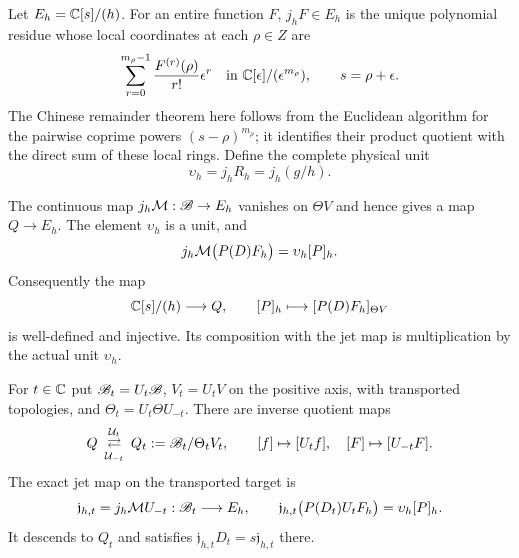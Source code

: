Let $E_h=\mathbb C[s]/(h)$. For an entire function $F$, $j_hF\in E_h$
is the unique polynomial residue whose local coordinates at each
$\rho\in Z$ are
\begin{equation}\label{hdt:eq:jets}
\sum_{r=0}^{m_\rho-1}\frac{F^{(r)}(\rho)}{r!}\epsilon^r
\quad\text{in }\mathbb C[\epsilon]/(\epsilon^{m_\rho}),\qquad s=\rho+\epsilon.
\end{equation}
The Chinese remainder theorem here follows from the Euclidean
algorithm for the pairwise coprime powers $(s-\rho)^{m_\rho}$;
it identifies their product quotient with the direct sum of these
local rings. Define the complete physical unit
\begin{equation}\label{hdt:eq:unit}
\upsilon_h=j_hR_h=j_h(g/h).
\end{equation}

\begin{hdttheorem}\label{hdt:thm:jets}
The continuous map $j_h\mathcal M:\mathscr B\to E_h$ vanishes on $\Theta V$
and hence gives a map $Q\to E_h$. The element $\upsilon_h$ is
a unit, and
\begin{equation}\label{hdt:eq:physical-jet}
j_h\mathcal M\bigl(P(D)F_h\bigr)=\upsilon_h[P]_h.
\end{equation}
Consequently the map
\begin{equation}\label{hdt:eq:physical-injection}
\mathbb C[s]/(h)\longrightarrow Q,\qquad
[P]_h\longmapsto[P(D)F_h]_{\Theta V}
\end{equation}
is well-defined and injective. Its composition with the jet map is
multiplication by the actual unit $\upsilon_h$.

For $t\in\mathbb C$ put $\mathscr B_t=U_t\mathscr B$, $V_t=U_tV$ on the positive
axis, with transported topologies, and
$\Theta_t=U_t\Theta U_{-t}$. There are inverse quotient maps
\begin{equation}\label{hdt:eq:quotient-transport}
Q\ \mathop{\rightleftarrows}^{\mathcal U_t}_{\mathcal U_{-t}}\
Q_t:=\mathscr B_t/\Theta_tV_t,
\qquad [f]\mapsto[U_tf],\quad[F]\mapsto[U_{-t}F].
\end{equation}
The exact jet map on the transported target is
\begin{equation}\label{hdt:eq:transported-jet}
\mathfrak j_{h,t}=j_h\mathcal M U_{-t}:\mathscr B_t\longrightarrow E_h,
\qquad
\mathfrak j_{h,t}\bigl(P(D_t)U_tF_h\bigr)
=\upsilon_h[P]_h.
\end{equation}
It descends to $Q_t$ and satisfies
$\mathfrak j_{h,t}D_t=s\mathfrak j_{h,t}$ there.
\end{hdttheorem}
